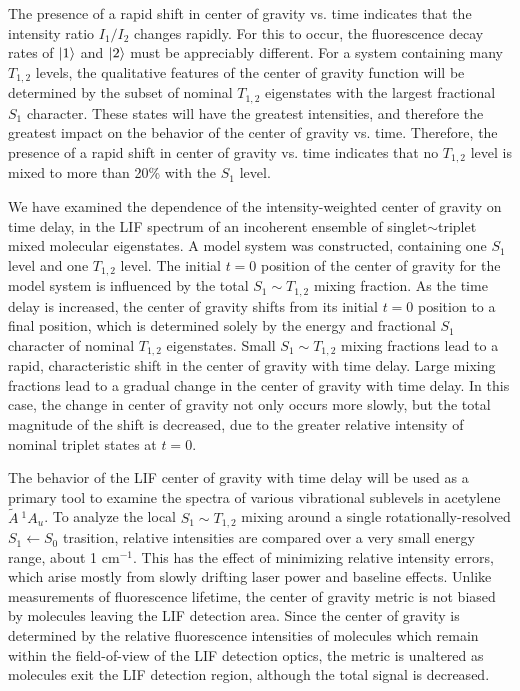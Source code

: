 \documentclass[12pt]{mitthesis}
\newcommand{\rcm}{cm$^{-1}$}
\newcommand{\astate}{$
  \tilde{A} \: ^1\!A_u
  $}
\begin{document}
The presence of a rapid shift in center of gravity vs. time indicates
that the intensity ratio $I_1/I_2$ changes rapidly.  For this to
occur, the fluorescence decay rates of $\mathinner{|{1}\rangle}$ and $\mathinner{|{2}\rangle}$ must be
appreciably different.  For a system containing many $T_{1,2}$ levels,
the qualitative features of the center of gravity function will be
determined by the subset of nominal $T_{1,2}$ eigenstates with the
largest fractional $S_1$ character.  These states will have the
greatest intensities, and therefore the greatest impact on the
behavior of the center of gravity vs. time.  Therefore, the presence
of a rapid shift in center of gravity vs. time indicates that no
$T_{1,2}$ level is mixed to more than 20\% with the $S_1$ level.

We have examined the dependence of the intensity-weighted center of
gravity on time delay, in the LIF spectrum of an incoherent ensemble
of singlet$\sim$triplet mixed molecular eigenstates.  A model system
was constructed, containing one $S_1$ level and one $T_{1,2}$ level.
The initial $t=0$ position of the center of gravity for the model
system is influenced by the total $S_1 \sim T_{1,2}$ mixing fraction.
As the time delay is increased, the center of gravity shifts from its
initial $t=0$ position to a final position, which is determined solely
by the energy and fractional $S_1$ character of nominal $T_{1,2}$
eigenstates.  Small $S_1 \sim T_{1,2}$ mixing fractions lead to a
rapid, characteristic shift in the center of gravity with time delay.
Large mixing fractions lead to a gradual change in the center of
gravity with time delay.  In this case, the change in center of
gravity not only occurs more slowly, but the total magnitude of the
shift is decreased, due to the greater relative intensity of nominal
triplet states at $t=0$.

The behavior of the LIF center of gravity with time delay will be used
as a primary tool to examine the spectra of various vibrational
sublevels in acetylene \astate.  To analyze the local $S_1 \sim
T_{1,2}$ mixing around a single rotationally-resolved $S_1 \leftarrow
S_0$ trasition, relative intensities are compared over a very small
energy range, about 1 \rcm.  This has the effect of minimizing
relative intensity errors, which arise mostly from slowly drifting
laser power and baseline effects.  Unlike measurements of fluorescence
lifetime, the center of gravity metric is not biased by molecules
leaving the LIF detection area.  Since the center of gravity is
determined by the relative fluorescence intensities of molecules which
remain within the field-of-view of the LIF detection optics, the
metric is unaltered as molecules exit the LIF detection region,
although the total signal is decreased.
\end{document}
